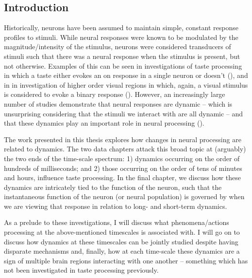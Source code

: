 \begin{refsection}

\chapter{Introduction}

Historically, neurons have been assumed to maintain simple, constant response profiles to stimuli. While neural responses were known to be modulated by the magnitude/intensity of the stimulus, neurons were considered transducers of stimuli such that there was a neural response when the stimulus is present, but not otherwise. Examples of this can be seen in investigations of taste processing in which a taste either evokes an on response in a single neuron or doesn’t (\cite{mark1988a,yaxley1988a,yamamoto1989a}), and in in investigation of higher order visual regions in which, again, a visual stimulus is considered to evoke a binary response (\cite{hasselmo1989a,gross1992a,rolls1995a}). However, an increasingly large number of studies demonstrate that neural responses are dynamic – which is unsurprising considering that the stimuli we interact with are all dynamic – and that these dynamics play an important role in neural processing (\cite{sugase1999a,katz2001a,brincat2006a,sadacca2016a,brincat2018a,saravani2019a}).

The work presented in this thesis explores how changes in neural processing are related to dynamics. The two data chapters attack this broad topic at (arguably) the two ends of the time-scale spectrum: 1) dynamics occurring on the order of hundreds of milliseconds; and 2) those occurring on the order of tens of minutes and hours, influence taste processing. In the final chapter, we discuss how these dynamics are intricately tied to the function of the neuron, such that the instantaneous function of the neuron (or neural population) is governed by when we are viewing that response in relation to long- and short-term dynamics.

As a prelude to these investigations, I will discuss what phenomena/actions processing at the above-mentioned timescales is associated with. I will go on to discuss how dynamics at these timescales can be jointly studied despite having disparate mechanisms and, finally, how at each time-scale these dynamics are a sign of multiple brain regions interacting with one another – something which has not been investigated in taste processing previously.



\end{refsection}

